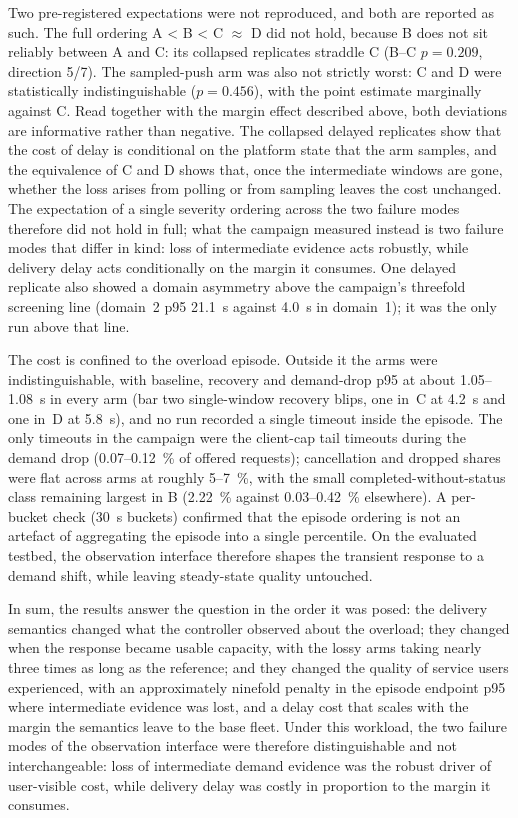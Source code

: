 Two pre-registered expectations were not reproduced, and both are reported
as such. The full ordering A < B < C $\approx$ D did not hold, because B
does not sit reliably between A and C: its collapsed replicates straddle C
(B--C $p = 0.209$, direction 5/7). The sampled-push arm was also not strictly
worst: C and D were statistically indistinguishable ($p = 0.456$), with the
point estimate marginally against C. Read together with the margin effect
described above, both deviations are informative rather than negative. The
collapsed delayed replicates show that the cost of delay is conditional on
the platform state that the arm samples, and the equivalence of C and D
shows that, once the intermediate windows are gone, whether the loss arises
from polling or from sampling leaves the cost unchanged. The expectation of
a single severity ordering across the two failure modes therefore did not
hold in full; what the campaign measured instead is two failure modes that
differ in kind: loss of intermediate evidence acts robustly, while delivery
delay acts conditionally on the margin it consumes. One delayed replicate
also showed a domain asymmetry above the campaign's threefold screening line
(domain~2 p95 21.1~s against 4.0~s in domain~1); it was the only run above
that line.

The cost is confined to the overload episode. Outside it the arms were
indistinguishable, with baseline, recovery and demand-drop p95 at about
1.05--1.08~s in every arm (bar two single-window recovery blips, one in~C at
4.2~s and one in~D at 5.8~s), and no run recorded a single timeout inside the
episode. The only timeouts in the campaign were the client-cap tail timeouts
during the demand drop (0.07--0.12~\% of offered requests); cancellation and
dropped shares were flat across arms at roughly 5--7~\%, with the small
completed-without-status class remaining largest in B (2.22~\% against
0.03--0.42~\% elsewhere). A per-bucket check (30~s buckets) confirmed that
the episode ordering is not an artefact of aggregating the episode into a
single percentile. On the evaluated testbed, the observation interface
therefore shapes the transient response to a demand shift, while leaving
steady-state quality untouched.

In sum, the results answer the question in the order it was posed: the
delivery semantics changed what the controller observed about the overload;
they changed when the response became usable capacity, with the lossy arms
taking nearly three times as long as the reference; and they changed the
quality of service users experienced, with an approximately ninefold penalty
in the episode endpoint p95 where intermediate evidence was lost, and a
delay cost that scales with the margin the semantics leave to the base
fleet. Under this workload, the two failure modes of the observation
interface were therefore distinguishable and not interchangeable: loss of
intermediate demand evidence was the robust driver of user-visible cost,
while delivery delay was costly in proportion to the margin it consumes.
